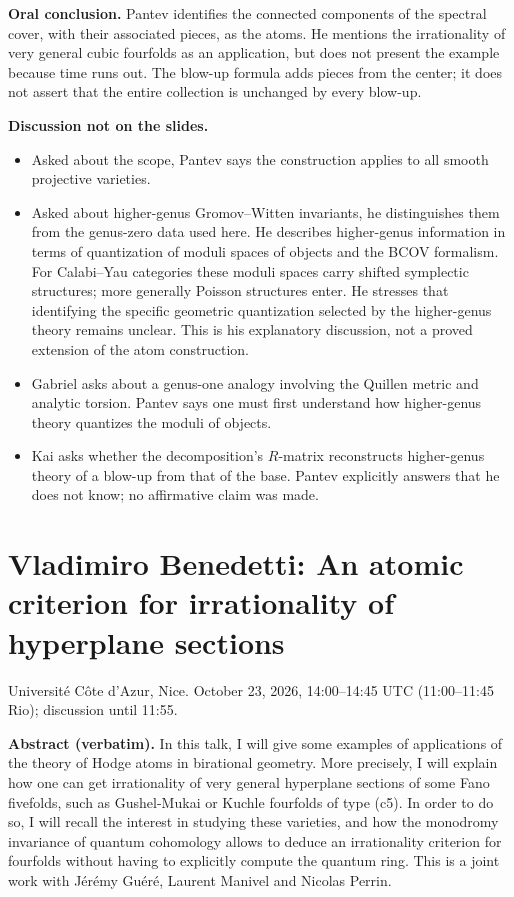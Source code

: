 \textbf{Oral conclusion.}
Pantev identifies the connected components
of the spectral cover, with their associated
pieces, as the atoms. He mentions the
irrationality of very general cubic
fourfolds as an application, but does not
present the example because time runs out.
The blow-up formula adds pieces from the
center; it does not assert that the entire
collection is unchanged by every blow-up.

\medskip\noindent
\textbf{Discussion not on the slides.}
\begin{itemize}
\item Asked about the scope, Pantev says
the construction applies to all smooth
projective varieties.
\item Asked about higher-genus
Gromov--Witten invariants, he distinguishes
them from the genus-zero data used here.
He describes higher-genus information in
terms of quantization of moduli spaces of
objects and the BCOV formalism. For
Calabi--Yau categories these moduli spaces
carry shifted symplectic structures;
more generally Poisson structures enter.
He stresses that identifying the specific
geometric quantization selected by the
higher-genus theory remains unclear.
This is his explanatory discussion, not a
proved extension of the atom construction.
\item Gabriel asks about a genus-one
analogy involving the Quillen metric and
analytic torsion. Pantev says one must
first understand how higher-genus theory
quantizes the moduli of objects.
\item Kai asks whether the decomposition's
$R$-matrix reconstructs higher-genus theory
of a blow-up from that of the base.
Pantev explicitly answers that he does not
know; no affirmative claim was made.
\end{itemize}

\section{Vladimiro Benedetti: An atomic
criterion for irrationality of
hyperplane sections}
\label{section-vbac-benedetti}
Universit\'e C\^ote d'Azur, Nice.
October 23, 2026, 14:00--14:45 UTC
(11:00--11:45 Rio); discussion until 11:55.

\medskip\noindent
\textbf{Abstract (verbatim).}
In this talk, I will give some examples of
applications of the theory of Hodge atoms
in birational geometry. More precisely,
I will explain how one can get irrationality
of very general hyperplane sections of some
Fano fivefolds, such as Gushel-Mukai or
Kuchle fourfolds of type (c5). In order to
do so, I will recall the interest in
studying these varieties, and how the
monodromy invariance of quantum cohomology
allows to deduce an irrationality criterion
for fourfolds without having to explicitly
compute the quantum ring. This is a joint
work with J\'er\'emy Gu\'er\'e,
Laurent Manivel and Nicolas Perrin.

